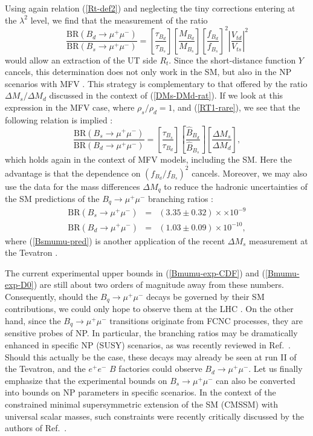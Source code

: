\documentclass[11pt]{cernrep}
\begin{document}
Using again relation (\ref{Rt-def2}) and neglecting the tiny corrections entering
at the $\lambda^2$ level, we find that the measurement of the ratio
\begin{equation}\label{RT1-rare}
\frac{\mbox{BR}(B_d\to\mu^+\mu^-)}{\mbox{BR}(B_s\to\mu^+\mu^-)}=
\left[\frac{\tau_{B_d}}{\tau_{B_s}}\right]
\left[\frac{M_{B_d}}{M_{B_s}}\right]
\left[\frac{f_{B_d}}{f_{B_s}}\right]^2
\left|\frac{V_{td}}{V_{ts}}\right|^2
\end{equation}
would allow an extraction of the UT side $R_t$. Since the short-distance
function $Y$ cancels, this determination does not only work in the SM,
but also in the NP scenarios with MFV \cite{buras-MFV}. This
strategy is complementary to that offered by the ratio $\Delta M_s/\Delta M_d$
discussed in the context of (\ref{DMs-DMd-rat}). If we look at this
expression  in the MFV case, where $\rho_s/\rho_d=1$, 
and  (\ref{RT1-rare}), we see that the following relation is implied \cite{Buras-rel}:
\begin{equation}\label{Bmumu-DM-rel}
\frac{\mbox{BR}(B_s\to\mu^+\mu^-)}{\mbox{BR}(B_d\to\mu^+\mu^-)}=
\left[\frac{\tau_{B_s}}{\tau_{B_d}}\right]
\left[\frac{\hat B_{B_d}}{\hat B_{B_s}}\right]
\left[\frac{\Delta M_s}{\Delta M_d}\right],
\end{equation}
which holds again in the context of MFV models, including the SM. 
Here the advantage is that the dependence on $(f_{B_d}/f_{B_s})^2$ cancels. 
Moreover, we may also use the data for the mass differences
$\Delta M_q$ to reduce the hadronic uncertainties 
of the SM predictions of the $B_q\to\mu^+\mu^-$ branching ratios 
\cite{Buras-rel}:
\begin{eqnarray}
\mbox{BR}(B_s \to \mu^+ \mu^-) &=& (3.35 \pm 0.32)\times\times 
10^{-9}\label{Bsmumu-pred}\\
\mbox{BR}(B_d\to \mu^+ \mu^-) &=& (1.03 \pm 0.09)\times 10^{-10},
\end{eqnarray}
where (\ref{Bsmumu-pred}) is another application of the recent $\Delta M_s$ 
measurement at the Tevatron \cite{BBGT}.

The current experimental upper bounds in (\ref{Bmumu-exp-CDF}) 
and  (\ref{Bmumu-exp-D0}) are still about two
orders of magnitude away from these numbers. 
Consequently, should the $B_q \to \mu^+ \mu^-$ decays 
be governed by their SM contributions, we could only 
hope to observe them at the LHC \cite{LHC-Book}.
On the other hand, since the $B_q \to \mu^+ \mu^-$ transitions originate from 
FCNC processes, they are sensitive probes of NP. In particular, 
the branching ratios may be dramatically enhanced in specific NP (SUSY) 
scenarios, as was recently reviewed in Ref.~\cite{buras-NP}. Should this 
actually be the case, these decays may already be seen at run II of the 
Tevatron, and the $e^+e^-$ $B$ factories could observe $B_d\to \mu^+ \mu^-$. 
Let us finally emphasize that the experimental bounds on 
$B_s\to\mu^+\mu^-$ can also be converted into bounds on NP parameters
in specific scenarios. In the context of the constrained minimal 
supersymmetric extension 
of the SM (CMSSM) with universal scalar masses, such constraints were
recently critically  discussed by the authors of Ref.~\cite{EOS}.
\end{document}
